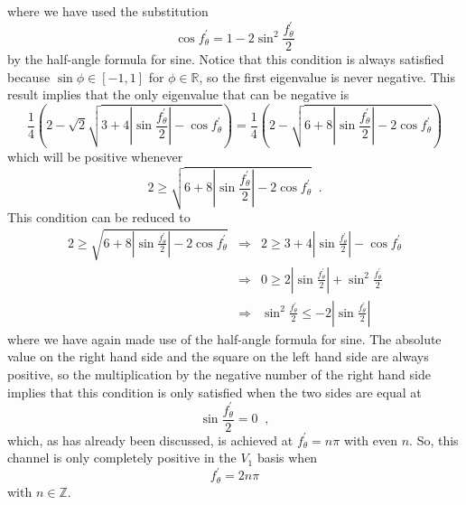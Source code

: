 where we have used the substitution
$$
\cos{f^\prime_\theta} = 1 - 2\sin^2{\frac{f^\prime_\theta}{2}}
$$
by the half-angle formula for sine.  Notice that this condition is always satisfied because $\sin\phi\in[-1,1]$ for $\phi\in\mathbb{R}$, so the first eigenvalue is never negative.  This result implies that the only eigenvalue that can be negative is
$$
\frac{1}{4}\left(2-\sqrt{2}\sqrt{3+4\left|\sin{\frac{f^\prime_\theta}{2}}\right| - \cos{f^\prime_\theta}}\right) = \frac{1}{4}\left(2-\sqrt{6+8\left|\sin{\frac{f^\prime_\theta}{2}}\right| - 2\cos{f^\prime_\theta}}\right)
$$
which will be positive whenever
$$
2\ge \sqrt{6+8\left|\sin{\frac{f^\prime_\theta}{2}}\right| - 2\cos{f^\prime_\theta}}\;\;.
$$
This condition can be reduced to
\begin{eqnarray*}
2\ge \sqrt{6+8\left|\sin{\frac{f^\prime_\theta}{2}}\right| - 2\cos{f^\prime_\theta}}
&\Rightarrow& 2\ge 3+4\left|\sin{\frac{f^\prime_\theta}{2}}\right| - \cos{f^\prime_\theta}\\
&\Rightarrow& 0\ge 2\left|\sin{\frac{f^\prime_\theta}{2}}\right| +\sin^2{\frac{f^\prime_\theta}{2}}\\
&\Rightarrow& \sin^2{\frac{f^\prime_\theta}{2}} \le -2\left|\sin{\frac{f^\prime_\theta}{2}}\right|
\end{eqnarray*}
where we have again made use of the half-angle formula for sine.  The absolute value on the right hand side and the square on the left hand side are always positive, so the multiplication by the negative number of the right hand side implies that this condition is only satisfied when the two sides are equal at
$$
\sin{\frac{f^\prime_\theta}{2}} = 0\;\;,
$$
which, as has already been discussed, is achieved at $f^\prime_\theta = n\pi$ with even $n$.  So, this channel is only completely positive in the $V_1$ basis when 
$$
f^\prime_\theta = 2n\pi 
$$
with $n\in\mathbb{Z}$.

